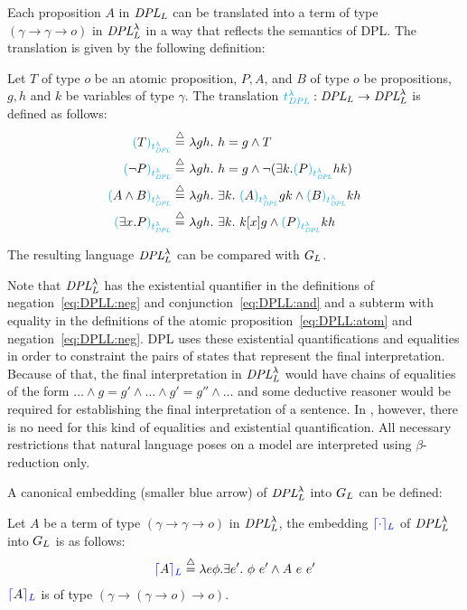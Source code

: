 Each proposition $A$ in $\textit{DPL}_L$ can be translated into a term of type $(\gamma \rightarrow \gamma \rightarrow o)$ in $\textit{DPL}^\lambda_L$ in a way that reflects the semantics of DPL. The translation is given by the following definition:
\begin{definition} Let $T$ of type $o$ be an atomic proposition, $P, A$, and $B$ of type $o$ be propositions, $g,h$ and $k$ be variables of type $\gamma$. The translation $\textcolor{cyan}{t^{\lambda}_\textit{DPL}}:\textit{DPL}_L \rightarrow \textit{DPL}^\lambda_L$ is defined as follows:
\begin{subequations}
\begin{align}
 \mdplstodpll{T} \defeq \ & \lambda gh. \  h = g \land T \label{eq:DPLL:atom} \\
 \mdplstodpll{\neg P} \defeq \ & \lambda gh. \ h = g \land \neg (\exists k. \mdplstodpll{P} h k) \label{eq:DPLL:neg} \\
 \mdplstodpll{A \land B} \defeq \ & \lambda gh.  \ \exists k. \ \mdplstodpll{A} g k  \land \mdplstodpll{B} k h  \label{eq:DPLL:and} \\
 \mdplstodpll{\exists x. P} \defeq \ & \lambda gh.  \ \exists k. \  k [ x] g \land \mdplstodpll{P} k h \label{eq:DPLL:exist} 
\end{align}
\end{subequations}
\end{definition}

\noindent The resulting language $\textit{DPL}^\lambda_L$ can be compared with $G_L$. 

Note that $\textit{DPL}^\lambda_L$ has the existential quantifier in the definitions of negation~\eqref{eq:DPLL:neg} and conjunction~\eqref{eq:DPLL:and} and a subterm with equality in the definitions of the atomic proposition~\eqref{eq:DPLL:atom} and negation~\eqref{eq:DPLL:neg}. DPL uses these existential quantifications and equalities in order to constraint the pairs of states that represent the final interpretation. Because of that, the final interpretation in $\textit{DPL}^\lambda_L$ would have chains of equalities of the form $\dots \land g = g' \land  \dots  \land g'=g'' \land  \dots   $ and some deductive reasoner would be required for establishing the final interpretation of a sentence.
 In {\GN}, however, there is no need for this kind of equalities and existential quantification.  All necessary restrictions that natural language poses on a model are interpreted using $\beta$-reduction only.

A canonical embedding (smaller blue arrow) of $\textit{DPL}^\lambda_L$ into $G_L$ can be defined:
\begin{definition} Let $A$ be a term of type $(\gamma \rightarrow \gamma \rightarrow o)$ in $\textit{DPL}^\lambda_L$, the embedding $\textcolor{blue}{\lceil \cdot \rceil_L}$  of $\textit{DPL}^\lambda_L$ into $G_L$ is as follows:
\begin{align}
\textcolor{blue}{\lceil} A \textcolor{blue}{\rceil_L} \stackrel{{\scriptstyle\triangle}}{=} \lambda e \phi. \exists e'.  \ \phi \ e' \land  A \ e \ e'  \notag
\end{align}
$\textcolor{blue}{\lceil} A \textcolor{blue}{\rceil_L}$ is of type $(\gamma \rightarrow (\gamma \rightarrow o) \rightarrow o)$.
\end{definition}


